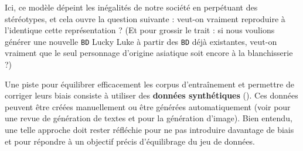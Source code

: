 \begin{leftBarExamples}
				
				Ici, ce modèle dépeint les inégalités de notre société en perpétuant des stéréotypes, et cela ouvre la question suivante : veut-on vraiment reproduire à l'identique cette représentation ?
				(Et pour grossir le trait : si nous voulions générer une nouvelle \texttt{BD} Lucky Luke à partir des \texttt{BD} déjà existantes, veut-on vraiment que le seul personnage d'origine asiatique soit encore à la blanchisserie ?)
			\end{leftBarExamples}
			\begin{leftBarIdea}
				Une piste pour équilibrer efficacement les corpus d'entraînement et permettre de corriger leurs biais consiste à utiliser des \textbf{données synthétiques} (\cite{jaipuria-etal:2020:deflating-dataset-bias}).
				Ces données peuvent être créées manuellement ou être générées automatiquement (voir \cite{shorten-etal:2021:text-data-augmentation} pour une revue de génération de textes et \cite{shorten-khoshgoftaar:2019:survey-image-data} pour la génération d'image).
				Bien entendu, une telle approche doit rester réfléchie pour ne pas introduire davantage de biais et pour répondre à un objectif précis d'équilibrage du jeu de données.
			\end{leftBarIdea}
			
